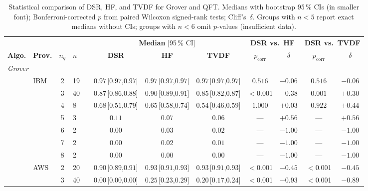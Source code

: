 \documentclass[10pt,conference]{IEEEtran}
\begin{document}
\begin{table}[ht!]
  \centering
  \caption{Statistical comparison of DSR, HF, and TVDF for Grover and QFT. Medians with bootstrap 95\,\% CIs ({\scriptsize in smaller font}); Bonferroni-corrected $p$ from paired Wilcoxon signed-rank tests; Cliff's~$\delta$. Groups with $n < 5$ report exact medians without CIs; groups with $n < 6$ omit $p$-values (insufficient data).}
  \label{tab:stat_comparison}
  \small
  \begin{tabular}{cl cl r ccc cc cc}
  \hline
  & & & & & \multicolumn{3}{c}{\textbf{Median} [{\scriptsize 95\,\% CI}]} & \multicolumn{2}{c}{\textbf{DSR vs.\ HF}} & \multicolumn{2}{c}{\textbf{DSR vs.\ TVDF}} \\
  \textbf{Algo.} & \textbf{Prov.} & \textbf{$n_q$} & \textbf{$n$} & & \textbf{DSR} & \textbf{HF} & \textbf{TVDF} & $p_{\text{corr}}$ & $\delta$ & $p_{\text{corr}}$ & $\delta$ \\
  \hline
  \multicolumn{12}{l}{\textit{Grover}} \\
  \hline
   & IBM & 2 & 19 & & $0.97$\,{\scriptsize[$0.97$,$0.97$]} & $0.97$\,{\scriptsize[$0.97$,$0.97$]} & $0.97$\,{\scriptsize[$0.97$,$0.97$]} & $0.516$ & $-0.06$ & $0.516$ & $-0.06$ \\
   & & 3 & 40 & & $0.87$\,{\scriptsize[$0.86$,$0.88$]} & $0.90$\,{\scriptsize[$0.89$,$0.91$]} & $0.85$\,{\scriptsize[$0.82$,$0.87$]} & $<$0.001 & $-0.38$ & $0.001$ & $+0.30$ \\
   & & 4 & 8 & & $0.68$\,{\scriptsize[$0.51$,$0.79$]} & $0.65$\,{\scriptsize[$0.58$,$0.74$]} & $0.54$\,{\scriptsize[$0.46$,$0.59$]} & $1.000$ & $+0.03$ & $0.922$ & $+0.44$ \\
   & & 5 & 3 & & $0.11$ & $0.07$ & $0.06$ & --- & $+0.56$ & --- & $+0.56$ \\
   & & 6 & 2 & & $0.00$ & $0.03$ & $0.02$ & --- & $-1.00$ & --- & $-1.00$ \\
   & & 7 & 2 & & $0.00$ & $0.02$ & $0.01$ & --- & $-1.00$ & --- & $-1.00$ \\
   & & 8 & 2 & & $0.00$ & $0.00$ & $0.00$ & --- & $-1.00$ & --- & $-1.00$ \\
  \cline{2-12}
   & AWS & 2 & 20 & & $0.90$\,{\scriptsize[$0.89$,$0.91$]} & $0.93$\,{\scriptsize[$0.91$,$0.93$]} & $0.93$\,{\scriptsize[$0.91$,$0.93$]} & $<$0.001 & $-0.45$ & $<$0.001 & $-0.45$ \\
   & & 3 & 40 & & $0.00$\,{\scriptsize[$0.00$,$0.00$]} & $0.25$\,{\scriptsize[$0.23$,$0.29$]} & $0.20$\,{\scriptsize[$0.17$,$0.24$]} & $<$0.001 & $-0.93$ & $<$0.001 & $-0.89$ \\

\end{tabular}
\end{table}
\end{document}
